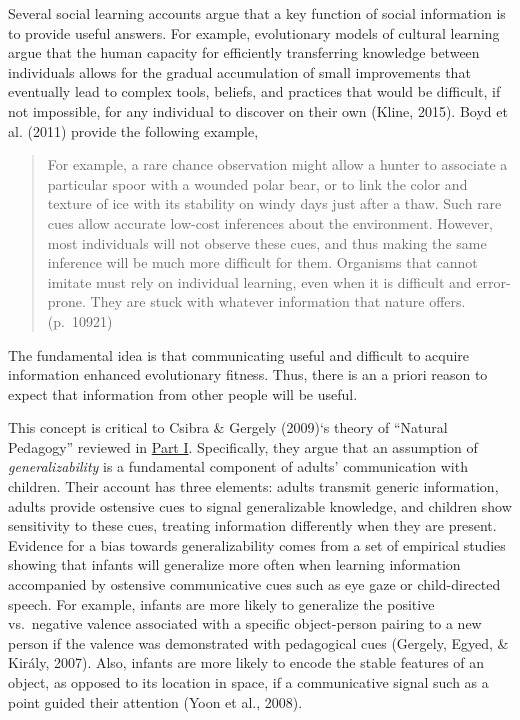 \documentclass[oneside]{report}
\begin{document}
Several social learning accounts argue that a key function of social
information is to provide useful answers. For example, evolutionary
models of cultural learning argue that the human capacity for
efficiently transferring knowledge between individuals allows for the
gradual accumulation of small improvements that eventually lead to
complex tools, beliefs, and practices that would be difficult, if not
impossible, for any individual to discover on their own (Kline, 2015).
Boyd et al. (2011) provide the following example,
\begin{quote}
For example, a rare chance observation might allow a hunter to associate
a particular spoor with a wounded polar bear, or to link the color and
texture of ice with its stability on windy days just after a thaw. Such
rare cues allow accurate low-cost inferences about the environment.
However, most individuals will not observe these cues, and thus making
the same inference will be much more difficult for them. Organisms that
cannot imitate must rely on individual learning, even when it is
difficult and error-prone. They are stuck with whatever information that
nature offers. (p.~10921)
\end{quote}
\noindent The fundamental idea is that communicating useful and
difficult to acquire information enhanced evolutionary fitness. Thus,
there is an a priori reason to expect that information from other people
will be useful.

This concept is critical to Csibra \& Gergely (2009)`s theory of
``Natural Pedagogy'' reviewed in \protect\hyperlink{p1}{Part I}.
Specifically, they argue that an assumption of \emph{generalizability}
is a fundamental component of adults' communication with children. Their
account has three elements: adults transmit generic information, adults
provide ostensive cues to signal generalizable knowledge, and children
show sensitivity to these cues, treating information differently when
they are present. Evidence for a bias towards generalizability comes
from a set of empirical studies showing that infants will generalize
more often when learning information accompanied by ostensive
communicative cues such as eye gaze or child-directed speech. For
example, infants are more likely to generalize the positive vs.~negative
valence associated with a specific object-person pairing to a new person
if the valence was demonstrated with pedagogical cues (Gergely, Egyed,
\& Király, 2007). Also, infants are more likely to encode the stable
features of an object, as opposed to its location in space, if a
communicative signal such as a point guided their attention (Yoon et
al., 2008).
\end{document}
